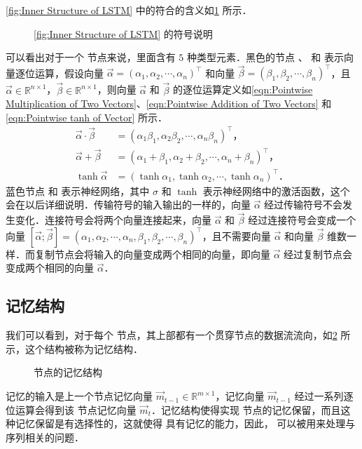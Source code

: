 \cref{fig:Inner Structure of LSTM} 中的符合的含义如\cref{fig:Legend of Inner Structure of LSTM} 所示．%
%
\begin{figure}[!htb]
  \centering
  \scalebox{0.7}{}
  \caption{\cref{fig:Inner Structure of LSTM} 的符号说明}
  \label{fig:Legend of Inner Structure of LSTM}
\end{figure}%
%
可以看出对于一个 \lstm{} 节点来说，里面含有 $5$ 种类型元素．黑色的节点 、 和  表示向量逐位运算，假设向量 $\vec{\alpha} = (\alpha_1, \alpha_2, \cdots, \alpha_n)^\top$ 和向量 $\vec{\beta} = (\beta_1, \beta_2, \cdots, \beta_n)^\top$，且 $\vec{\alpha}\in\mathbb{R}^{n\times 1}$，$\vec{\beta}\in\mathbb{R}^{n\times 1}$，则向量 $\vec{\alpha}$ 和 $\vec{\beta}$ 的逐位运算定义如\cref{eqn:Pointwise Multiplication of Two Vectors}、\cref{eqn:Pointwise Addition of Two Vectors} 和\cref{eqn:Pointwise tanh of Vector} 所示．%
%
\begin{align}
  \label{eqn:Pointwise Multiplication of Two Vectors}
  \vec{\alpha}\cdot\vec{\beta} &= (\alpha_1\beta_1, \alpha_2\beta_2, \cdots, \alpha_n\beta_n)^\top\text{，}\\
  \label{eqn:Pointwise Addition of Two Vectors}
  \vec{\alpha}+\vec{\beta} &= (\alpha_1 + \beta_1, \alpha_2 + \beta_2, \cdots, \alpha_n + \beta_n)^\top\text{，}\\
  \label{eqn:Pointwise tanh of Vector}
  \tanh{\vec{\alpha}} &= (\tanh{\alpha_1}, \tanh{\alpha_2}, \cdots, \tanh{\alpha_n})^\top\text{．}
\end{align}%
%
蓝色节点  和  表示神经网络，其中 $\sigma$ 和 $\tanh$ 表示神经网络中的激活函数，这个会在以后详细说明．传输符号的输入输出的一样的，向量 $\vec{\alpha}$ 经过传输符号不会发生变化．连接符号会将两个向量连接起来，向量 $\vec{\alpha}$ 和 $\vec{\beta}$ 经过连接符号会变成一个向量 $[\vec{\alpha};\vec{\beta}] = (\alpha_1, \alpha_2, \cdots, \alpha_n, \beta_1, \beta_2, \cdots, \beta_n)^\top$，且不需要向量 $\vec{\alpha}$ 和向量 $\vec{\beta}$ 维数一样．而复制节点会将输入的向量变成两个相同的向量，即向量 $\vec{\alpha}$ 经过复制节点会变成两个相同的向量 $\vec{\alpha}$．

\subsection{\lstm{} 记忆结构}
我们可以看到，对于每个 \lstm{} 节点，其上部都有一个贯穿节点的数据流流向，如\cref{fig:State Transfer of LSTM} 所示，这个结构被称为记忆结构．%
%
\begin{figure}[!htb]
  \centering
  \scalebox{0.7}{}
  \caption{\lstm{} 节点的记忆结构}
  \label{fig:State Transfer of LSTM}
\end{figure}%
%
记忆的输入是上一个节点记忆向量 $\vec{m}_{t-1}\in\mathbb{R}^{m\times 1}$，记忆向量 $\vec{m}_{t-1}$ 经过一系列逐位运算会得到该 \lstm{} 节点记忆向量 $\vec{m}_t$．记忆结构使得实现 \lstm{} 节点的记忆保留，而且这种记忆保留是有选择性的，这就使得 \lstm{} 具有记忆的能力，因此，\lstm{} 可以被用来处理与序列相关的问题．

